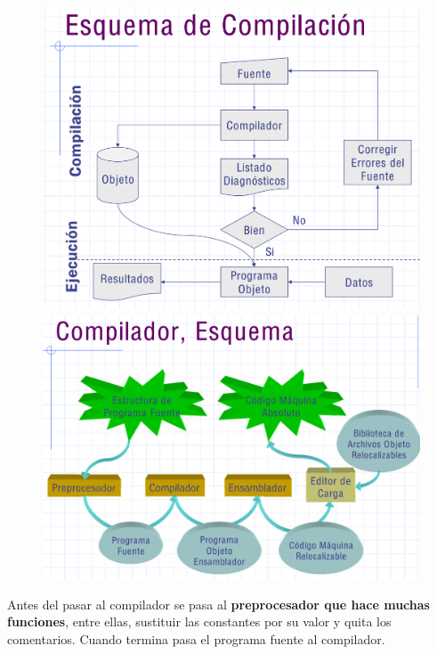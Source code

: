 \documentclass[12pt, twoside, openright]{report} %
\begin{document}
\begin{figure}[H]
	{\includegraphics[scale=.15]{Untitled 9.png}
	\includegraphics[scale=.15]{Untitled 10.png}}
\end{figure}



Antes del pasar al compilador se pasa al \textbf{preprocesador que hace muchas funciones}, entre ellas, sustituir las constantes por su valor y quita los comentarios. Cuando termina pasa el programa fuente al compilador.
\end{document}

